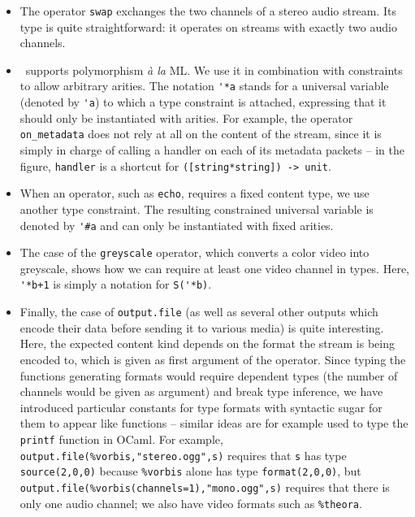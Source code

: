 \begin{itemize}
\item The operator \texttt{swap} exchanges the two channels of a stereo audio
  stream. Its type is quite straightforward: it operates on streams with exactly
  two audio channels.
\item
  \liquidsoap\ supports polymorphism \emph{à la} ML.
  We use it in combination with constraints to allow arbitrary arities.
  The notation \verb.'*a. stands for a universal variable (denoted
  by \verb.'a.) to which a type constraint is attached, expressing that
  it should only be instantiated with arities.
  For example, the operator \verb.on_metadata. does not rely
  at all on the content of the stream, since it is simply in
  charge of calling a handler on each of its metadata packets --
  in the figure, \verb.handler. is a shortcut for
  \verb.([string*string]) -> unit..
\item When an operator, such as \verb.echo., requires a fixed content type, we
  use another type constraint. The resulting constrained universal
  variable is denoted by \verb.'#a. and can only be instantiated with
  fixed arities.
\item The case of the \texttt{greyscale} operator, which converts a color
  video into greyscale, shows how we can require at least one video channel in
  types.  Here, \verb.'*b+1. is simply a notation for \verb.S('*b)..
\item Finally, the case of \verb#output.file# (as well as several other outputs
  which encode their data before sending it to various media) is quite
  interesting. Here, the expected content kind depends on the format the stream
  is being encoded to, which is given as first argument of the operator. Since
  typing the functions generating formats would require dependent types (the
  number of channels would be given as argument) and break type inference, we
  have introduced particular constants for type formats with syntactic sugar for
  them to appear like functions -- similar ideas are for example used to type
  the \texttt{printf} function in OCaml. For example,
  \verb$output.file(%vorbis,"stereo.ogg",s)$ requires that
  \verb.s. has type \verb.source(2,0,0). because \verb.%vorbis. alone
  has type \verb.format(2,0,0).,
  but \verb$output.file(%vorbis(channels=1),"mono.ogg",s)$
  requires that there is only one audio channel;
  we also have video formats such as \verb.%theora..
\end{itemize}

